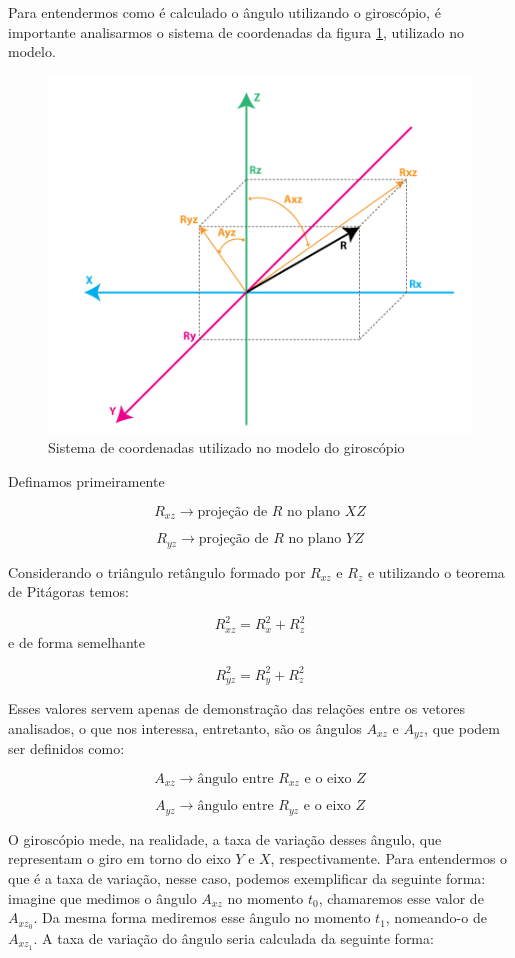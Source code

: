 \documentclass[a4paper,12pt]{article}
\begin{document}
Para entendermos como é calculado o ângulo utilizando o giroscópio, é importante analisarmos o sistema de coordenadas da figura \ref{eixos3}, utilizado no modelo.

\begin{figure}[H]
\centering
\includegraphics[width=.5\textwidth]{img/eixos3.png}
\caption{Sistema de coordenadas utilizado no modelo do giroscópio}
\label{eixos3}
\end{figure}

 Definamos primeiramente 

$$R_{xz} \longrightarrow \mbox{projeção de }R\mbox{ no plano }XZ$$

$$R_{yz} \longrightarrow \mbox{projeção de }R\mbox{ no plano }YZ$$

Considerando o triângulo retângulo formado por $R_{xz}$ e $R_z$ e utilizando o teorema de Pitágoras temos:

$$R_{xz}^2=R_x^2+R_z^2$$ e de forma semelhante

$$R_{yz}^2=R_y^2+R_z^2$$

Esses valores servem apenas de demonstração das relações entre os vetores analisados, o que nos interessa, entretanto, são os ângulos $A_{xz}$ e $A_{yz}$, que podem ser definidos como:

$$A_{xz} \longrightarrow \mbox{ângulo entre }R_{xz}\mbox{ e o eixo }Z$$

$$A_{yz} \longrightarrow \mbox{ângulo entre }R_{yz}\mbox{ e o eixo }Z$$

O giroscópio mede, na realidade, a taxa de variação desses ângulo, que representam o giro em torno do eixo $Y$ e $X$, respectivamente. Para entendermos o que é a taxa de variação, nesse caso, podemos exemplificar da seguinte forma: imagine que medimos o ângulo $A_{xz}$ no momento $t_0$, chamaremos esse valor de $A_{xz_0}$. Da mesma forma mediremos esse ângulo no momento $t_1$, nomeando-o de $A_{xz_1}$. A taxa de variação do ângulo seria calculada da seguinte forma:
\end{document}
